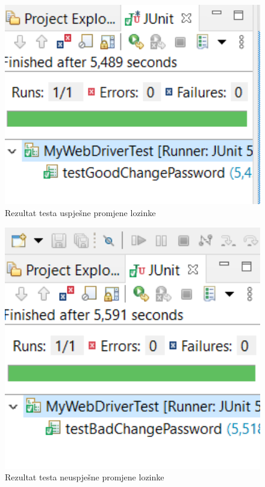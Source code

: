 \begin{flushleft}
			\begin{figure}[hp]
                    \centering
                    \includegraphics[width=15cm]{slike/passwordgood.png}
                    \caption{Rezultat testa uspješne promjene lozinke}
                    \label{fig:useCase-2}
                \end{figure}
			\eject
			
			\begin{figure}[hp]
                    \centering
                    \includegraphics[width=15cm]{slike/passwordbad.png}
                    \caption{Rezultat testa neuspješne promjene lozinke}
                    \label{fig:useCase-2}
                \end{figure}
			\eject
			

\end{flushleft}
